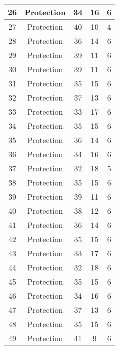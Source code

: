 \documentclass[results.tex]{subfiles}
\begin{document}
\begin{center}
\begin{tabular}{| c || c | c | c | c |}
    \hline
    26 & Protection & 34 & 16 & 6 \\ 
    \hline
    27 & Protection & 40 & 10 & 4 \\ 
    \hline
    28 & Protection & 36 & 14 & 6 \\ 
    \hline
    29 & Protection & 39 & 11 & 6 \\ 
    \hline
    30 & Protection & 39 & 11 & 6 \\ 
    \hline
    31 & Protection & 35 & 15 & 6 \\ 
    \hline
    32 & Protection & 37 & 13 & 6 \\ 
    \hline
    33 & Protection & 33 & 17 & 6 \\ 
    \hline
    34 & Protection & 35 & 15 & 6 \\ 
    \hline
    35 & Protection & 36 & 14 & 6 \\ 
    \hline
    36 & Protection & 34 & 16 & 6 \\ 
    \hline
    37 & Protection & 32 & 18 & 5 \\ 
    \hline
    38 & Protection & 35 & 15 & 6 \\ 
    \hline
    39 & Protection & 39 & 11 & 6 \\ 
    \hline
    40 & Protection & 38 & 12 & 6 \\ 
    \hline
    41 & Protection & 36 & 14 & 6 \\ 
    \hline
    42 & Protection & 35 & 15 & 6 \\ 
    \hline
    43 & Protection & 33 & 17 & 6 \\ 
    \hline
    44 & Protection & 32 & 18 & 6 \\ 
    \hline
    45 & Protection & 35 & 15 & 6 \\ 
    \hline
    46 & Protection & 34 & 16 & 6 \\ 
    \hline
    47 & Protection & 37 & 13 & 6 \\ 
    \hline
    48 & Protection & 35 & 15 & 6 \\ 
    \hline
    49 & Protection & 41 & 9 & 6 \\ 
    \hline   \end{tabular}
\end{center}
\end{document}

